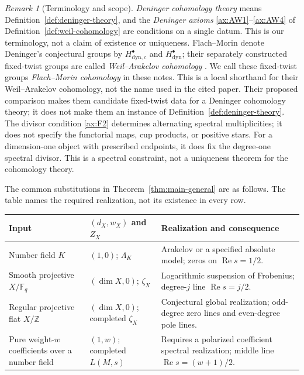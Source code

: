 \documentclass[11pt]{amsart}
\theoremstyle{plain}
\theoremstyle{definition}
\theoremstyle{remark}
\newtheorem{remark}[theorem]{Remark}
\numberwithin{equation}{section}
\newcommand{\Z}{\mathbb{Z}}
\newcommand{\F}{\mathbb{F}}
\DeclareMathOperator{\Rea}{Re}
\renewcommand{\Re}{\Rea}
\begin{document}
\begin{remark}[Terminology and scope]
\label{rem:deninger-terminology}
\emph{Deninger cohomology theory} means
Definition~\ref{def:deninger-theory}, and the \emph{Deninger axioms}
\ref{ax:AW1}--\ref{ax:AW4} of Definition~\ref{def:weil-cohomology} are
conditions on a single datum. This is our terminology, not a claim of
existence or uniqueness. Flach--Morin denote Deninger's conjectural
groups by $H^\bullet_{\mathrm{dyn},c}$ and
$H^\bullet_{\mathrm{dyn}}$; their separately constructed fixed-twist
groups are called \emph{Weil--Arakelov cohomology}
\cite[abstract, Conjecture~2.3, and \S3]%
{FlachMorin2020DeningerWeilArakelov}. We call these fixed-twist
groups \emph{Flach--Morin cohomology} in these notes. This is a local
shorthand for their Weil--Arakelov cohomology, not the name used in
the cited paper. Their proposed comparison
\cite[Conjecture~4.1, p.~527]{FlachMorin2020DeningerWeilArakelov}
makes them candidate fixed-twist data for a Deninger cohomology
theory; it does not make them an instance of
Definition~\ref{def:deninger-theory}. The divisor condition
\ref{ax:F2} determines alternating spectral multiplicities; it does
not specify the functorial maps, cup products, or positive stars. For
a dimension-one object with prescribed endpoints, it does fix the
degree-one spectral divisor. This is a spectral constraint, not a
uniqueness theorem for the cohomology theory.
\end{remark}

The common substitutions in Theorem~\ref{thm:main-general} are as follows.
The table names the required realization, not its existence in every row.
\begin{center}\small
\begin{tabular}{@{}p{}p{}p{}@{}}
\toprule
Input & $(d_X,w_X)$ and $Z_X$ & Realization and consequence\\
\midrule
Number field $K$ & $(1,0)$; $\Lambda_K$ &
Arakelov or a specified absolute model; zeros on $\Re s=1/2$.\\
Smooth projective $X/\F_q$ & $(\dim X,0)$; $\zeta_X$ &
Logarithmic suspension of Frobenius; degree-$j$ line $\Re s=j/2$.\\
Regular projective flat $X/\Z$ & $(\dim X,0)$; completed $\zeta_X$ &
Conjectural global realization; odd-degree zero lines and even-degree
pole lines.\\
Pure weight-$w$ coefficients over a number field & $(1,w)$;
completed $L(M,s)$ &
Requires a polarized coefficient spectral realization; middle line
$\Re s=(w+1)/2$.\\
\bottomrule
\end{tabular}
\end{center}
\end{document}
